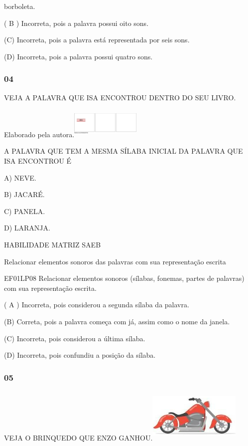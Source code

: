 borboleta.

( B ) Incorreta, pois a palavra possui oito sons.

(C) Incorreta, pois a palavra está representada por seis sons.

(D) Incorreta, pois a palavra possui quatro sons.

\subsubsection{04}\label{section-76}

VEJA A PALAVRA QUE ISA ENCONTROU DENTRO DO SEU LIVRO.

Elaborado pela
autora.\includegraphics[width=1.29722in,height=0.57917in]{media/image244.png}

A PALAVRA QUE TEM A MESMA SÍLABA INICIAL DA PALAVRA QUE ISA ENCONTROU É

A) NEVE.

B) JACARÉ.

C) PANELA.

D) LARANJA.

HABILIDADE MATRIZ SAEB

Relacionar elementos sonoros das palavras com sua representação escrita

EF01LP08 Relacionar elementos sonoros (sílabas, fonemas, partes de
palavras) com sua representação escrita.

( A ) Incorreta, pois considerou a segunda sílaba da palavra.

(B) Correta, pois a palavra começa com já, assim como o nome da janela.

(C) Incorreta, pois considerou a última sílaba.

(D) Incorreta, pois confundiu a posição da
sílaba.\protect\hypertarget{_heading=h.33l0sngjt3hj}{}{}

\subsubsection{05}\label{section-77}

VEJA O BRINQUEDO QUE ENZO
GANHOU.\includegraphics[width=1.73681in,height=1.03125in]{media/image245.jpg}

